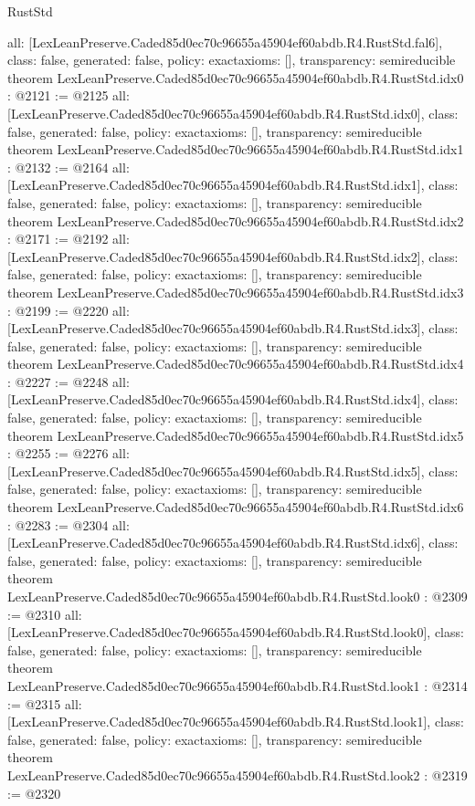 \begin{lexlean}{RustStd}
\begin{coremodule}
{  all: [LexLeanPreserve.Caded85d0ec70c96655a45904ef60abdb.R4.RustStd.fal6],
  class: false,
  generated: false,
  policy: exact{axioms: []},
  transparency: semireducible
}
theorem LexLeanPreserve.Caded85d0ec70c96655a45904ef60abdb.R4.RustStd.idx0 : @2121 := @2125 {
  all: [LexLeanPreserve.Caded85d0ec70c96655a45904ef60abdb.R4.RustStd.idx0],
  class: false,
  generated: false,
  policy: exact{axioms: []},
  transparency: semireducible
}
theorem LexLeanPreserve.Caded85d0ec70c96655a45904ef60abdb.R4.RustStd.idx1 : @2132 := @2164 {
  all: [LexLeanPreserve.Caded85d0ec70c96655a45904ef60abdb.R4.RustStd.idx1],
  class: false,
  generated: false,
  policy: exact{axioms: []},
  transparency: semireducible
}
theorem LexLeanPreserve.Caded85d0ec70c96655a45904ef60abdb.R4.RustStd.idx2 : @2171 := @2192 {
  all: [LexLeanPreserve.Caded85d0ec70c96655a45904ef60abdb.R4.RustStd.idx2],
  class: false,
  generated: false,
  policy: exact{axioms: []},
  transparency: semireducible
}
theorem LexLeanPreserve.Caded85d0ec70c96655a45904ef60abdb.R4.RustStd.idx3 : @2199 := @2220 {
  all: [LexLeanPreserve.Caded85d0ec70c96655a45904ef60abdb.R4.RustStd.idx3],
  class: false,
  generated: false,
  policy: exact{axioms: []},
  transparency: semireducible
}
theorem LexLeanPreserve.Caded85d0ec70c96655a45904ef60abdb.R4.RustStd.idx4 : @2227 := @2248 {
  all: [LexLeanPreserve.Caded85d0ec70c96655a45904ef60abdb.R4.RustStd.idx4],
  class: false,
  generated: false,
  policy: exact{axioms: []},
  transparency: semireducible
}
theorem LexLeanPreserve.Caded85d0ec70c96655a45904ef60abdb.R4.RustStd.idx5 : @2255 := @2276 {
  all: [LexLeanPreserve.Caded85d0ec70c96655a45904ef60abdb.R4.RustStd.idx5],
  class: false,
  generated: false,
  policy: exact{axioms: []},
  transparency: semireducible
}
theorem LexLeanPreserve.Caded85d0ec70c96655a45904ef60abdb.R4.RustStd.idx6 : @2283 := @2304 {
  all: [LexLeanPreserve.Caded85d0ec70c96655a45904ef60abdb.R4.RustStd.idx6],
  class: false,
  generated: false,
  policy: exact{axioms: []},
  transparency: semireducible
}
theorem LexLeanPreserve.Caded85d0ec70c96655a45904ef60abdb.R4.RustStd.look0 : @2309 := @2310 {
  all: [LexLeanPreserve.Caded85d0ec70c96655a45904ef60abdb.R4.RustStd.look0],
  class: false,
  generated: false,
  policy: exact{axioms: []},
  transparency: semireducible
}
theorem LexLeanPreserve.Caded85d0ec70c96655a45904ef60abdb.R4.RustStd.look1 : @2314 := @2315 {
  all: [LexLeanPreserve.Caded85d0ec70c96655a45904ef60abdb.R4.RustStd.look1],
  class: false,
  generated: false,
  policy: exact{axioms: []},
  transparency: semireducible
}
theorem LexLeanPreserve.Caded85d0ec70c96655a45904ef60abdb.R4.RustStd.look2 : @2319 := @2320 {
}
\end{coremodule}
\end{lexlean}
